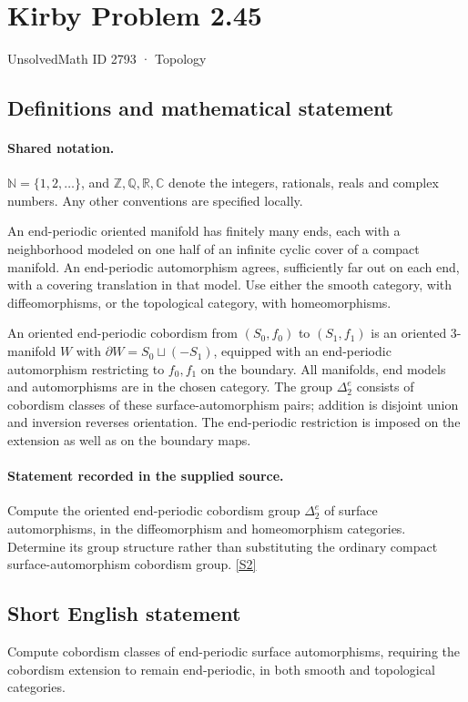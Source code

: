 \documentclass[11pt]{article}
\newcommand{\sref}[2]{\hyperlink{source:#1:#2}{[S#2]}}
\begin{document}
\setcounter{section}{2792}
\section{Kirby Problem 2.45}\label{2793}
{\small\sffamily UnsolvedMath ID 2793 · Topology}
\subsection{Definitions and mathematical statement}

\paragraph{Shared notation.}$\mathbb N=\{1,2,\ldots\}$, and $\mathbb Z,\mathbb Q,\mathbb R,\mathbb C$ denote the integers, rationals, reals and complex numbers. Any other conventions are specified locally.


An end-periodic oriented manifold has finitely many ends, each with a neighborhood modeled on one half of an infinite cyclic cover of a compact manifold. An end-periodic automorphism agrees, sufficiently far out on each end, with a covering translation in that model. Use either the smooth category, with diffeomorphisms, or the topological category, with homeomorphisms.

An oriented end-periodic cobordism from $(S_0,f_0)$ to $(S_1,f_1)$ is an oriented 3-manifold $W$ with $\partial W=S_0\sqcup(-S_1)$, equipped with an end-periodic automorphism restricting to $f_0,f_1$ on the boundary. All manifolds, end models and automorphisms are in the chosen category. The group $\Delta^e_2$ consists of cobordism classes of these surface-automorphism pairs; addition is disjoint union and inversion reverses orientation. The end-periodic restriction is imposed on the extension as well as on the boundary maps.
\paragraph{Statement recorded in the supplied source.}
Compute the oriented end-periodic cobordism group $\Delta^e_2$ of surface automorphisms, in the diffeomorphism and homeomorphism categories. Determine its group structure rather than substituting the ordinary compact surface-automorphism cobordism group. \sref{2793}{2}

\subsection{Short English statement}
Compute cobordism classes of end-periodic surface automorphisms, requiring the cobordism extension to remain end-periodic, in both smooth and topological categories.
\end{document}
